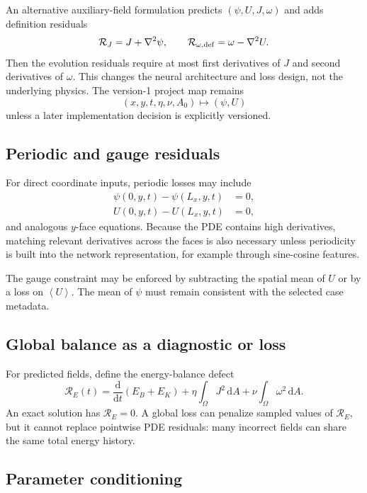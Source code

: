 \documentclass[11pt]{article}
\newcommand{\dd}{\mathrm{d}}
\newcommand{\average}[1]{\left\langle #1\right\rangle}
\begin{document}
An alternative auxiliary-field formulation predicts $(\psi,U,J,\omega)$ and adds definition residuals
\begin{equation}
\mathcal{R}_J=J+\nabla^2\psi,
\qquad
\mathcal{R}_{\omega,\rm def}=\omega-\nabla^2U.
\end{equation}
Then the evolution residuals require at most first derivatives of $J$ and second derivatives of $\omega$. This changes the neural architecture and loss design, not the underlying physics. The version-1 project map remains
\begin{equation}
(x,y,t,\eta,\nu,A_0)\longmapsto(\psi,U)
\end{equation}
unless a later implementation decision is explicitly versioned.

\subsection{Periodic and gauge residuals}

For direct coordinate inputs, periodic losses may include
\begin{align}
\psi(0,y,t)-\psi(L_x,y,t)&=0,\\
U(0,y,t)-U(L_x,y,t)&=0,
\end{align}
and analogous $y$-face equations. Because the PDE contains high derivatives, matching relevant derivatives across the faces is also necessary unless periodicity is built into the network representation, for example through sine-cosine features.

The gauge constraint may be enforced by subtracting the spatial mean of $U$ or by a loss on $\average{U}$. The mean of $\psi$ must remain consistent with the selected case metadata.

\subsection{Global balance as a diagnostic or loss}

For predicted fields, define the energy-balance defect
\begin{equation}
\mathcal{R}_E(t)
=\frac{\dd}{\dd t}(E_B+E_K)
+\eta\int_\Omega J^2\,\dd A
+\nu\int_\Omega\omega^2\,\dd A.
\end{equation}
An exact solution has $\mathcal{R}_E=0$. A global loss can penalize sampled values of $\mathcal{R}_E$, but it cannot replace pointwise PDE residuals: many incorrect fields can share the same total energy history.

\subsection{Parameter conditioning}
\end{document}
